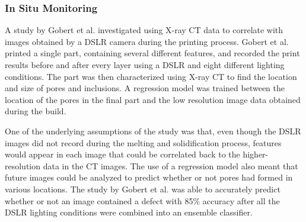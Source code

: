 \subsubsection{In Situ Monitoring}
A study by Gobert et al. investigated using X-ray CT data to correlate with images obtained by a DSLR camera during the printing process. Gobert et al. printed a single part, containing several different features, and recorded the print results before and after every layer using a DSLR and eight different lighting conditions. The part was then characterized using X-ray CT to find the location and size of pores and inclusions. A regression model was trained between the location of the pores in the final part and the low resolution image data obtained during the build. 

One of the underlying assumptions of the study was that, even though the DSLR images did not record during the melting and solidification process, features would appear in each image that could be correlated back to the higher-resolution data in the CT images. The use of a regression model also meant that future images could be analyzed to predict whether or not pores had formed in various locations. The study by Gobert et al. was able to accurately predict whether or not an image contained a defect with 85\% accuracy after all the DSLR lighting conditions were combined into an ensemble classifier. 
